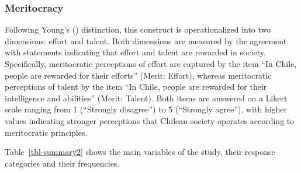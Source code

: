 \documentclass[
  12pt,
]{article}
\begin{document}
\subsubsection{Meritocracy}\label{meritocracy-1}

Following Young's () distinction,
this construct is operationalized into two dimensions: effort and
talent. Both dimensions are measured by the agreement with statements
indicating that effort and talent are rewarded in society. Specifically,
meritocratic perceptions of effort are captured by the item ``In Chile,
people are rewarded for their efforts'' (Merit: Effort), whereas
meritocratic perceptions of talent by the item ``In Chile, people are
rewarded for their intelligence and abilities'' (Merit: Talent). Both
items are answered on a Likert scale ranging from 1 (``Strongly
disagree'') to 5 (``Strongly agree''), with higher values indicating
stronger perceptions that Chilean society operates according to
meritocratic principles.

Table~\ref{tbl-summary2} shows the main variables of the study, their
response categories and their frequencies.
\end{document}
